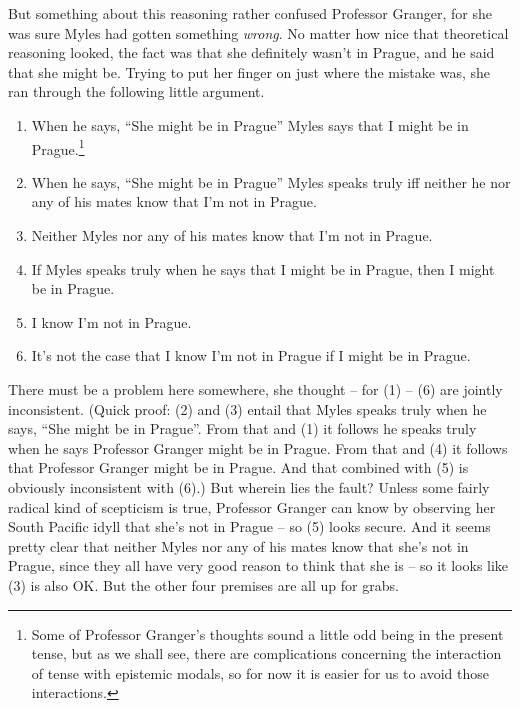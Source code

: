 But something about this reasoning rather confused Professor Granger, for she was sure Myles had gotten something \textit{wrong}. No matter how nice that theoretical reasoning looked, the fact was that she definitely wasn't in Prague, and he said that she might be. Trying to put her finger on just where the mistake was, she ran through the following little argument.
 
\renewcommand{\labelenumi}{(\arabic{enumi})} 
\begin{enumerate} 
\item When he says, ``She might be in Prague'' Myles says that I might be in Prague.\footnote{Some of Professor Granger's thoughts sound a little odd being in the present tense, but as we shall see, there are complications concerning the interaction of tense with epistemic modals, so for now it is easier for us to avoid those interactions.} 
 
\item When he says, ``She might be in Prague'' Myles speaks truly iff neither he nor any of his mates know that I'm not in Prague. 
 
\item  Neither Myles nor any of his mates know that I'm not in Prague. 
 
\item If Myles speaks truly when he says that I might be in Prague, then I might be in Prague. 
 
\item I know I'm not in Prague. 
 
\item It's not the case that I know I'm not in Prague if I might be in Prague. 
\end{enumerate} 
 
\noindent There must be a problem here somewhere, she thought -- for (1) -- (6) are jointly inconsistent. (Quick proof: (2) and (3) entail that Myles speaks truly when he says, ``She might be in Prague''. From that and (1) it follows he speaks truly when he says Professor Granger might be in Prague. From that and (4) it follows that Professor Granger might be in Prague. And that combined with (5) is obviously inconsistent with (6).) But wherein lies the fault? Unless some fairly radical kind of scepticism is true, Professor Granger can know by observing her South Pacific idyll that she's not in Prague -- so (5) looks secure. And it seems pretty clear that neither Myles nor any of his mates know that she's not in Prague, since they all have very good reason to think that she is -- so it looks like (3) is also OK. But the other four premises are all up for grabs.
 

